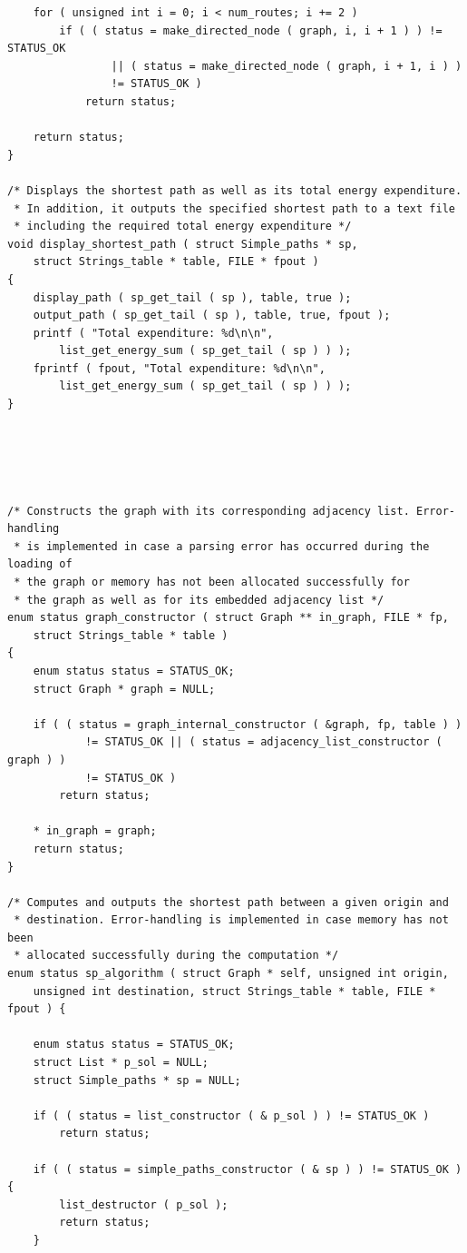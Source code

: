 \documentclass[11pt]{article}
\begin{document}
\begin{verbatim}
    for ( unsigned int i = 0; i < num_routes; i += 2 )
        if ( ( status = make_directed_node ( graph, i, i + 1 ) ) != STATUS_OK
                || ( status = make_directed_node ( graph, i + 1, i ) )
                != STATUS_OK )
            return status;

    return status;
}

/* Displays the shortest path as well as its total energy expenditure.
 * In addition, it outputs the specified shortest path to a text file
 * including the required total energy expenditure */
void display_shortest_path ( struct Simple_paths * sp,
    struct Strings_table * table, FILE * fpout )
{
    display_path ( sp_get_tail ( sp ), table, true );
    output_path ( sp_get_tail ( sp ), table, true, fpout );
    printf ( "Total expenditure: %d\n\n",
        list_get_energy_sum ( sp_get_tail ( sp ) ) );
    fprintf ( fpout, "Total expenditure: %d\n\n",
        list_get_energy_sum ( sp_get_tail ( sp ) ) );
}





/* Constructs the graph with its corresponding adjacency list. Error-handling
 * is implemented in case a parsing error has occurred during the loading of
 * the graph or memory has not been allocated successfully for
 * the graph as well as for its embedded adjacency list */
enum status graph_constructor ( struct Graph ** in_graph, FILE * fp,
    struct Strings_table * table )
{
    enum status status = STATUS_OK;
    struct Graph * graph = NULL;

    if ( ( status = graph_internal_constructor ( &graph, fp, table ) )
            != STATUS_OK || ( status = adjacency_list_constructor ( graph ) )
            != STATUS_OK )
        return status;

    * in_graph = graph;
    return status;
}

/* Computes and outputs the shortest path between a given origin and
 * destination. Error-handling is implemented in case memory has not been
 * allocated successfully during the computation */
enum status sp_algorithm ( struct Graph * self, unsigned int origin,
    unsigned int destination, struct Strings_table * table, FILE * fpout ) {

    enum status status = STATUS_OK;
    struct List * p_sol = NULL;
    struct Simple_paths * sp = NULL;

    if ( ( status = list_constructor ( & p_sol ) ) != STATUS_OK )
        return status;

    if ( ( status = simple_paths_constructor ( & sp ) ) != STATUS_OK ) {
        list_destructor ( p_sol );
        return status;
    }




\end{verbatim}
\end{document}
